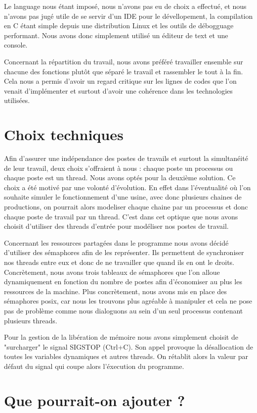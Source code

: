 \documentclass[11pt]{report}
\begin{document}
	Le language nous étant imposé, nous n'avons pas eu de choix a effectué, et nous n'avons pas jugé utile de se servir d'un IDE pour le dévellopement, la compilation en C étant simple depuis une distribution Linux et les outils de débogguage performant. Nous avons donc simplement utilisé un éditeur de text et une console. 
	
	Concernant la répartition du travail, nous avons préféré travailler ensemble sur chacune des fonctions plutôt que séparé le travail et rassembler le tout à la fin. Cela nous a permis d'avoir un regard critique sur les lignes de codes que l'on venait d'implémenter et surtout d'avoir une cohérence dans les technologies utilisées. 
	\section{Choix techniques}
	Afin d'assurer une indépendance des postes de travails et surtout la simultanéité de leur travail, deux choix s'offraient à nous : chaque poste un processus ou chaque poste est un thread. Nous avons optés pour la deuxième solution. Ce choix a été motivé par une volonté d'évolution. En effet dans l'éventualité où l'on souhaite simuler le fonctionnement d'une usine, avec donc plusieurs chaines de productions, on pourrait alors modeliser chaque chaine par un processus et donc chaque poste de travail par un thread. C'est dans cet optique que nous avons choisit d'utiliser des threads d'entrée pour modéliser nos postes de travail.
	
	Concernant les ressources partagées dans le programme nous avons décidé d'utiliser des sémaphores afin de les représenter. Ils permettent de synchroniser nos threads entre eux et donc de ne travailler que quand ils en ont le droits. Concrètement, nous avons trois tableaux de sémaphores que l'on alloue dynamiquement en fonction du nombre de postes afin d'économiser au plus les ressources de la machine. Plus concrètement, nous avons mis en place des sémaphores posix, car nous les trouvons plus agréable à manipuler et cela ne pose pas de problème comme nous dialoguons au sein d'un seul processus contenant plusieurs threads. 
	
	Pour la gestion de la libération de mémoire nous avons simplement choisit de "surcharger" le signal SIGSTOP (Ctrl+C). Son appel provoque la désallocation de toutes les variables dynamiques et autres threads. On rétablit alors la valeur par défaut du signal qui coupe alors l'éxecution du programme.
	
	\section{Que pourrait-on ajouter ?}
	
\end{document}
